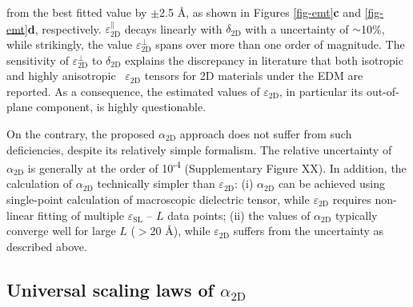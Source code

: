 \documentclass[journal=ancac3,manuscript=article,email=true,hyperref=true,keywords=false]{achemso}
\begin{document}
from the best fitted value by $\pm{}$2.5 \AA{}, as shown in Figures
\ref{fig-emt}\textbf{c} and \ref{fig-emt}\textbf{d},
respectively. $\varepsilon_{\mathrm{2D}}^{\parallel}$ decays linearly
with $\delta_{\mathrm{2D}}$ with a uncertainty of $\sim{}$10\%, while
strikingly, the value $\varepsilon_{\mathrm{2D}}^{\perp}$ spans over
more than one order of magnitude. The sensitivity of
$\varepsilon_{\mathrm{2D}}^{\perp}$ to $\delta_{\mathrm{2D}}$ explains
the discrepancy in literature that both isotropic~\cite{Sohier_2016}
and highly anisotropic~\cite{Matthes_2016,Laturia_2018}
$\varepsilon_{\mathrm{2D}}$ tensors for 2D materials under the EDM are
reported. As a consequence, the estimated values of
$\varepsilon_{\mathrm{2D}}$, in particular its out-of-plane component,
is highly questionable.

On the contrary, the proposed $\alpha_{\mathrm{2D}}$ approach does not
suffer from such deficiencies, despite its relatively simple
formalism. The relative uncertainty of $\alpha_{\mathrm{2D}}$ is
generally at the order of 10\textsuperscript{-4} (Supplementary Figure
{\color{red} XX}). In addition, the calculation of
$\alpha_{\mathrm{2D}}$ technically simpler than
$\varepsilon_{\mathrm{2D}}$: (i) $\alpha_{\mathrm{2D}}$ can be
achieved using single-point calculation of macroscopic dielectric
tensor, while $\varepsilon_{\mathrm{2D}}$ requires non-linear fitting
of multiple $\varepsilon_{\mathrm{SL}}$ -- $L$ data points; (ii) the
values of $\alpha_{\mathrm{2D}}$ typically converge well for large $L$
($>$20 \AA{}), while $\varepsilon_{\mathrm{2D}}$ suffers from the
uncertainty as described above. 



\subsection{Universal scaling laws of $\alpha_{\mathrm{2D}}$}
\label{sec:univ-scal-laws}
\end{document}
